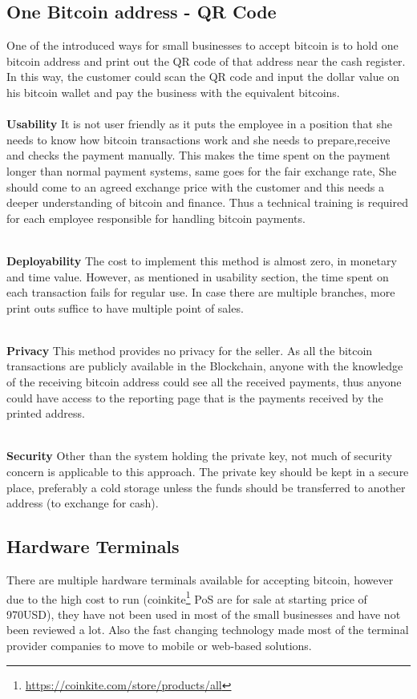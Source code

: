 \subsection{One Bitcoin address - QR Code} 
One of the introduced ways for small businesses to accept bitcoin is to hold one bitcoin address and print out the QR code of that address near the cash register. In this way, the customer could scan the QR code and input the dollar value on his bitcoin wallet and pay the business with the equivalent bitcoins. \\

\\\textbf{Usability} It is not user friendly as it puts the employee in a position that she needs to know how bitcoin transactions work and she needs to prepare,receive and checks the payment manually. This makes the time spent on the payment longer than normal payment systems, same goes for the fair exchange rate, She should come to an agreed exchange price with the customer and this needs a deeper understanding of bitcoin and finance. Thus a technical training is required for each employee responsible for handling bitcoin payments.

\\\textbf{Deployability} The cost to implement this method is almost zero, in monetary and time value. However, as mentioned in usability section, the time spent on each transaction fails for regular use. In case there are multiple branches, more print outs suffice to have multiple point of sales.

\\\textbf{Privacy} This method provides no privacy for the seller. As all the bitcoin transactions are publicly available in the Blockchain, anyone with the knowledge of the receiving bitcoin address could see all the received payments, thus anyone could have access to the reporting page that is the payments received by the printed address.

\\\textbf{Security} Other than the system holding the private key, not much of security concern is applicable to this approach. The private key should be kept in a secure place, preferably a cold storage unless the funds should be transferred to another address (\eg to exchange for cash).

\subsection{Hardware Terminals}
There are multiple hardware terminals available for accepting bitcoin, however due to the high cost to run (\eg coinkite\footnote{\url{https://coinkite.com/store/products/all}} PoS are for sale at starting price of 970USD), they have not been used in most of the small businesses and have not been reviewed a lot. Also the fast changing technology made most of the terminal provider companies to move to mobile or web-based solutions.

